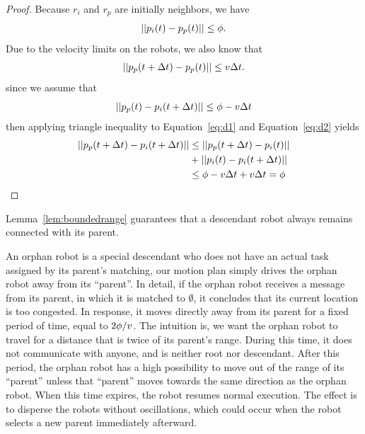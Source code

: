 \begin{proof}
Because $r_i$ and $r_p$ are initially neighbors, we have
  \begin{equation}
    || p_i(t) - p_p(t) || \leq \phi.
  \end{equation}
Due to the velocity limits on the robots, we also know that
  \begin{equation}\label{eq:d1}
    || p_p(t+\Delta t)- p_p(t) ||\leq v\Delta t.
  \end{equation}
since we assume that 
  \begin{equation}\label{eq:d2}
    || p_p(t) - p_i(t+\Delta t) || \leq \phi - v\Delta t
  \end{equation}
then applying triangle inequality to Equation~\ref{eq:d1} and Equation~\ref{eq:d2} yields
  \begin{eqnarray*}
  \label{eq:d3}
    || p_p(t+\Delta t) - p_i(t+\Delta t) || & \leq || p_p(t+\Delta t) - p_i(t)|| \\
      & + || p_i(t) - p_i(t+\Delta t)|| \\
      & \leq \phi - v\Delta t + v\Delta t = \phi
  \end{eqnarray*}
\end{proof}
\begin{figure}
    \centering
    
    \label{fig:boundedrange}
\end{figure}

Lemma~\ref{lem:boundedrange} guarantees that a descendant robot always remains connected with its parent. 

An orphan robot is a special descendant who does not have an actual task assigned by its parent's matching, our motion plan simply drives the orphan robot away from its ``parent''. 
%
In detail, if the orphan robot receives a message from its parent, in which it is matched to $\emptyset$, it concludes that its current location is too congested.
%
In response, it moves directly away from its parent for a fixed period of time, equal to $2\phi/v$.
%
The intuition is, we want the orphan robot to travel for a distance that is twice of its parent's range.
%
During this time, it does not communicate with anyone, and is neither root nor descendant. 
%
After this period, the orphan robot has a high possibility to move out of the range of its ``parent'' unless that ``parent'' moves towards the same direction as the orphan robot.
%
When this time expires, the robot resumes normal execution. 
%
The effect is to disperse the robots without oscillations, which could occur when the robot selects a new parent immediately afterward.


